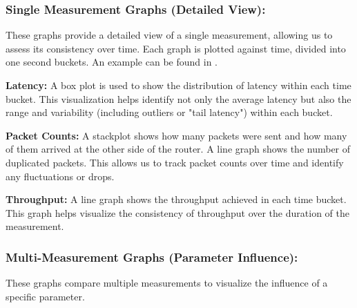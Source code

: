 \subsubsection{Single Measurement Graphs (Detailed View):}
\label{sect:graphs-single}
These graphs provide a detailed view of a single measurement, allowing us to assess its consistency over time.
Each graph is plotted against time, divided into one second buckets.
An example can be found in .

\noindent\textbf{Latency:} A box plot is used to show the distribution of latency within each time bucket.
This visualization helps identify not only the average latency but also the range and variability (including outliers or "tail latency") within each bucket.

\noindent\textbf{Packet Counts:} A stackplot shows how many packets were sent and how many of them arrived at the other side of the router.
A line graph shows the number of duplicated packets.
This allows us to track packet counts over time and identify any fluctuations or drops.

\noindent\textbf{Throughput:} A line graph shows the throughput achieved in each time bucket.
This graph helps visualize the consistency of throughput over the duration of the measurement.


\subsubsection{Multi-Measurement Graphs (Parameter Influence):}
\label{sect:graphs-multi}
These graphs compare multiple measurements to visualize the influence of a specific parameter.

